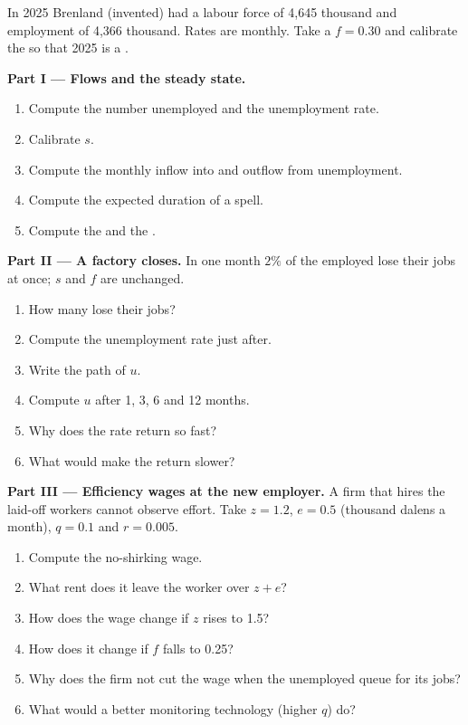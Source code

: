 \begin{problem}\label{pb:b1:unemployment-flows:brenland}
In 2025 Brenland (invented) had a labour force of 4,645 thousand and
employment of 4,366 thousand. Rates are monthly. Take a 
$f = 0.30$ and calibrate the  so that 2025 is a .

\medskip\noindent\textbf{Part I --- Flows and the steady state.}
\begin{enumerate}
  \item Compute the number unemployed and the unemployment rate.
  \item Calibrate $s$.
  \item Compute the monthly inflow into and outflow from unemployment.
  \item Compute the expected duration of a spell.
  \item Compute the  and the .
\end{enumerate}

\medskip\noindent\textbf{Part II --- A factory closes.} In one month $2\%$ of the
employed lose their jobs at once; $s$ and $f$ are unchanged.
\begin{enumerate}[resume]
  \item How many lose their jobs?
  \item Compute the unemployment rate just after.
  \item Write the path of $u$.
  \item Compute $u$ after 1, 3, 6 and 12 months.
  \item Why does the rate return so fast?
  \item What would make the return slower?
\end{enumerate}

\medskip\noindent\textbf{Part III --- Efficiency wages at the new employer.} A
firm that hires the laid-off workers cannot observe effort. Take $z = 1.2$,
$e = 0.5$ (thousand dalens a month), $q = 0.1$ and $r = 0.005$.
\begin{enumerate}[resume]
  \item Compute the no-shirking wage.
  \item What rent does it leave the worker over $z + e$?
  \item How does the wage change if $z$ rises to 1.5?
  \item How does it change if $f$ falls to 0.25?
  \item Why does the firm not cut the wage when the unemployed queue for its jobs?
  \item What would a better monitoring technology (higher $q$) do?
\end{enumerate}


\end{problem}
